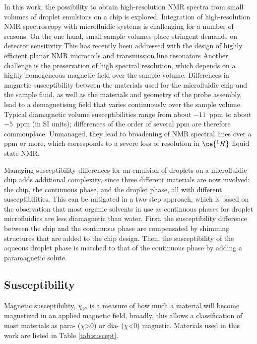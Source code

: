 In this work, the possibility to obtain high-resolution NMR spectra from
small volumes of droplet emulsions on a chip is explored.
Integration of high-resolution NMR spectroscopy with microfluidic systems is
challenging for a number of reasons.
On the one hand, small sample volumes place stringent demands on detector
sensitivity \citep{Badilita:2011td,Zalesskiy:2014hi}
This has recently been addressed with the design of
highly efficient planar NMR microcoils \citep{Spengler:2016km} and
transmission line resonators \citep{Finch:2016gv,sharma2019modular}
Another challenge is the preservation of high spectral
resolution, which depends on a highly homogeneous magnetic field
over the sample volume. Differences in magnetic susceptibility
between the materials used for the microfluidic chip
and the sample fluid, as well as the materials and geometry
of the probe assembly, lead to a demagnetising field
that varies continuously over the sample volume. Typical diamagnetic
volume susceptibilities range from about
$-11$~ppm to about $-5$~ppm (in SI units); \citep{Kuchel:2003ip,Durrant:2003kv}
differences of the order of several ppm are therefore commonplace.
Unmanaged, they lead to
broadening of NMR spectral lines over a ppm or more, which
corresponds to a severe loss of resolution in $\ce{^1H}$ liquid
state NMR.

Managing susceptibility differences for an emulsion of droplets on a
microfluidic chip adds additional complexity, since three different materials
are now involved: the chip, the continuous phase, and the droplet phase,
all with different susceptibilities.
This can be mitigated in a two-step approach,
which is based on the observation that most organic solvents in use
as continuous phases for droplet microfluidics are less diamagnetic than
water.
First, the susceptibility difference between the chip and the continuous phase
are compensated by shimming structures that are added to the
chip design. Then, the susceptibility of the aqueous droplet phase is matched
to that of the continuous phase by adding a paramagnetic solute.

\subsection{Susceptibility}

Magnetic susceptibility, $\chi_V$, is a measure of how much a material will become magnetized in an
applied magnetic field, broadly, this allows a classification of most materials as para- ($\chi$>0)
or dia- ($\chi$<0) magnetic. Materials used in this work are listed in Table \ref{tab:suscept}.

